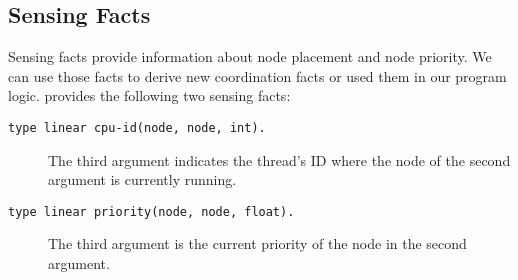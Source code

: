 \subsection{Sensing Facts}

Sensing facts provide information about node placement and node priority. We can use those facts
to derive new coordination facts or used them in our program logic. \lang provides the following two
sensing facts:

\begin{description}
   \item[\texttt{type linear cpu-id(node, node, int).}] The third argument indicates the thread's ID where the node of the second argument is currently running.
   \item[\texttt{type linear priority(node, node, float).}] The third argument is the current priority of the node in the second argument.
\end{description}
